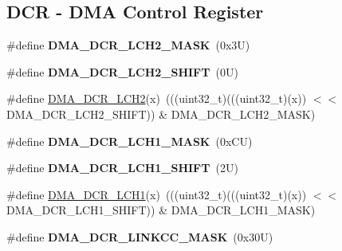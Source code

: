 \subsection*{D\+CR -\/ D\+MA Control Register}
\begin{DoxyCompactItemize}
\item 
\mbox{\label{group___d_m_a___register___masks_ga1e5f344c33c6cb40d3c1e0761a18569f}} 
\#define {\bfseries D\+M\+A\+\_\+\+D\+C\+R\+\_\+\+L\+C\+H2\+\_\+\+M\+A\+SK}~(0x3\+U)
\item 
\mbox{\label{group___d_m_a___register___masks_ga4fa245f27d90146588583445b590c8da}} 
\#define {\bfseries D\+M\+A\+\_\+\+D\+C\+R\+\_\+\+L\+C\+H2\+\_\+\+S\+H\+I\+FT}~(0\+U)
\item 
\#define \mbox{\hyperlink{group___d_m_a___register___masks_ga80d528487ff453ad561f9c879a2bc853}{D\+M\+A\+\_\+\+D\+C\+R\+\_\+\+L\+C\+H2}}(x)~(((uint32\+\_\+t)(((uint32\+\_\+t)(x)) $<$$<$ D\+M\+A\+\_\+\+D\+C\+R\+\_\+\+L\+C\+H2\+\_\+\+S\+H\+I\+FT)) \& D\+M\+A\+\_\+\+D\+C\+R\+\_\+\+L\+C\+H2\+\_\+\+M\+A\+SK)
\item 
\mbox{\label{group___d_m_a___register___masks_ga8d1ad8ec1d2dbb188583222b1a4d0442}} 
\#define {\bfseries D\+M\+A\+\_\+\+D\+C\+R\+\_\+\+L\+C\+H1\+\_\+\+M\+A\+SK}~(0x\+C\+U)
\item 
\mbox{\label{group___d_m_a___register___masks_ga7794ccc91b5f4ebe6e45a26f6dacb13b}} 
\#define {\bfseries D\+M\+A\+\_\+\+D\+C\+R\+\_\+\+L\+C\+H1\+\_\+\+S\+H\+I\+FT}~(2\+U)
\item 
\#define \mbox{\hyperlink{group___d_m_a___register___masks_gae057fb5ad2e80bffc35fe684e8892661}{D\+M\+A\+\_\+\+D\+C\+R\+\_\+\+L\+C\+H1}}(x)~(((uint32\+\_\+t)(((uint32\+\_\+t)(x)) $<$$<$ D\+M\+A\+\_\+\+D\+C\+R\+\_\+\+L\+C\+H1\+\_\+\+S\+H\+I\+FT)) \& D\+M\+A\+\_\+\+D\+C\+R\+\_\+\+L\+C\+H1\+\_\+\+M\+A\+SK)
\item 
\mbox{\label{group___d_m_a___register___masks_ga87b016be181c05a161edb3cf1659c85e}} 
\#define {\bfseries D\+M\+A\+\_\+\+D\+C\+R\+\_\+\+L\+I\+N\+K\+C\+C\+\_\+\+M\+A\+SK}~(0x30\+U)
\item 
\mbox{\label{group___d_m_a___register___masks_gac1a09d071e57c1cb8b3a89f102c5bd53}} 

\end{DoxyCompactItemize}
